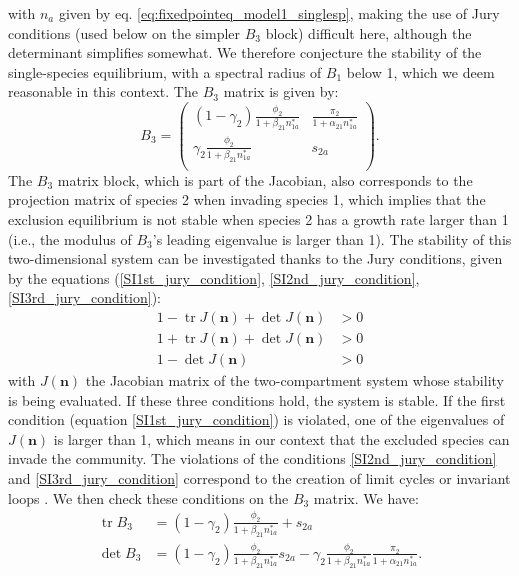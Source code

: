 \documentclass{article}
\DeclareMathOperator{\tr}{tr}
\begin{document}
with $n_a$ given by eq. \eqref{eq:fixedpointeq_model1_singlesp}, making the use of Jury conditions (used below on the simpler $B_3$ block) difficult here, although the determinant simplifies somewhat. We therefore conjecture the stability of the single-species equilibrium, with a spectral radius of $B_1$ below 1, which we deem reasonable in this context.
The $B_3$ matrix is given by:
\begin{equation}
    B_3 =
    \begin{pmatrix}
    (1-\gamma_2)\frac{\phi_2}{1+\beta_{21}n_{1a}^*} & \frac{\pi_2}{1+\alpha_{21}n_{1a}^*} \\
    \gamma_2\frac{\phi_2}{1+\beta_{21}n_{1a}^*} & s_{2a} \\
    \end{pmatrix}.
\end{equation}
The $B_3$ matrix block, which is part of the Jacobian, also corresponds to the projection matrix of species 2 when invading species 1, which implies that the exclusion equilibrium is not stable when species 2 has a growth rate larger than 1 (i.e., the modulus of $B_3$'s leading eigenvalue is larger than 1). The stability of this two-dimensional system can be investigated thanks to the Jury conditions, given by the equations (\ref{SI1st_jury_condition}, \ref{SI2nd_jury_condition}, \ref{SI3rd_jury_condition}):
\begin{align}
1- \tr J(\mathbf{n})+\det J(\mathbf{n}) &>0\label{SI1st_jury_condition}\\ 
1+ \tr J(\mathbf{n}) + \det J(\mathbf{n}) &> 0 \label{SI2nd_jury_condition}\\
1- \det J(\mathbf{n}) &> 0 \label{SI3rd_jury_condition}
\end{align}
with $J(\mathbf{n})$ the Jacobian matrix of the two-compartment system whose stability is being evaluated. If these three conditions hold, the system is stable. If the first condition (equation \eqref{SI1st_jury_condition}) is violated, one of the eigenvalues of $J(\mathbf{n})$ is larger than 1, which means in our context that the excluded species can invade the community. The violations of the conditions \eqref{SI2nd_jury_condition} and \eqref{SI3rd_jury_condition} correspond to the creation of limit cycles or invariant loops \citep{neubert2000density}. We then check these conditions on the $B_3$ matrix. We have:
\begin{align*}
    \tr B_3 &= (1-\gamma_2)\frac{\phi_2}{1+\beta_{21}n_{1a}^*} + s_{2a} \\
    \det B_3 &= (1-\gamma_2)\frac{\phi_2}{1+\beta_{21}n_{1a}^*}s_{2a} - \gamma_2\frac{\phi_2}{1+\beta_{21}n_{1a}^*}\frac{\pi_2}{1+\alpha_{21}n_{1a}^*}.
\end{align*}
\end{document}
